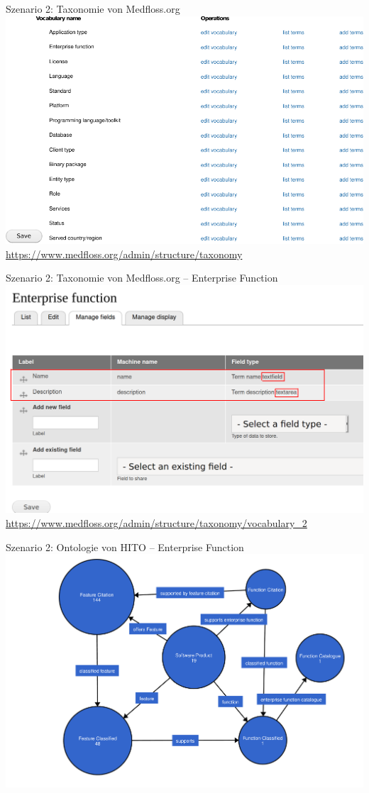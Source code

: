 \documentclass[aspectratio=1610,12pt]{beamer}
\begin{document}
\begin{frame}{Szenario 2: Taxonomie von Medfloss.org}
\centering
\includegraphics[height=.72\textheight]{img/medfloss-taxonomy.pdf}
\url{https://www.medfloss.org/admin/structure/taxonomy}
\end{frame}

\begin{frame}{Szenario 2: Taxonomie von Medfloss.org -- Enterprise Function}
\centering
\includegraphics[height=.72\textheight]{img/medfloss-function.png}
\url{https://www.medfloss.org/admin/structure/taxonomy/vocabulary_2}
\end{frame}

\begin{frame}{Szenario 2: Ontologie von HITO -- Enterprise Function}
\centering
\includegraphics[height=.8\textheight]{img/function.pdf}
\end{frame}
\end{document}
